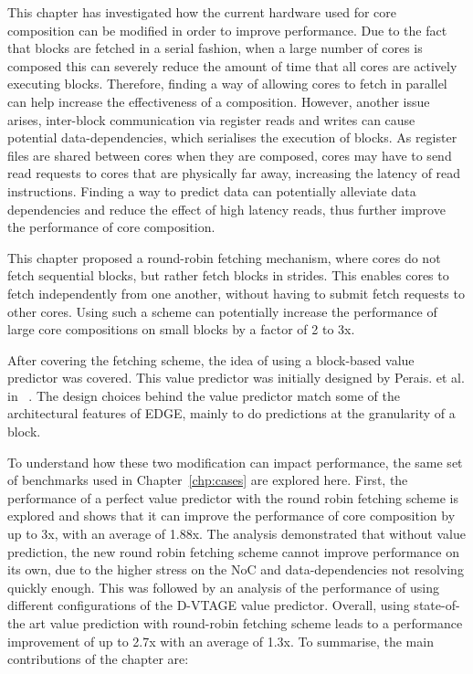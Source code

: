 This chapter has investigated how the current hardware used for core composition can be modified in order to improve performance.
Due to the fact that blocks are fetched in a serial fashion, when a large number of cores is composed this can severely reduce the amount of time that all cores are actively executing blocks.
Therefore, finding a way of allowing cores to fetch in parallel can help increase the effectiveness of a composition.
However, another issue arises, inter-block communication via register reads and writes can cause potential data-dependencies, which serialises the execution of blocks.
As register files are shared between cores when they are composed, cores may have to send read requests to cores that are physically far away, increasing the latency of read instructions.
Finding a way to predict data can potentially alleviate data dependencies and reduce the effect of high latency reads, thus further improve the performance of core composition.

This chapter proposed a round-robin fetching mechanism, where cores do not fetch sequential blocks, but rather fetch blocks in strides.
This enables cores to fetch independently from one another, without having to submit fetch requests to other cores.
Using such a scheme can potentially increase the performance of large core compositions on small blocks by a factor of 2 to 3x.

After covering the fetching scheme, the idea of using a block-based value predictor was covered.
This value predictor was initially designed by Perais. et al. in ~\cite{peraisVTAGE2014, peraisBeBop2015}.
The design choices behind the value predictor match some of the architectural features of EDGE, mainly to do predictions at the granularity of a block.

To understand how these two modification can impact performance, the same set of benchmarks used in Chapter~\ref{chp:cases} are explored here.
First, the performance of a perfect value predictor with the round robin fetching scheme is explored and shows that it can improve the performance of core composition by up to 3x, with an average of 1.88x.
The analysis demonstrated that without value prediction, the new round robin fetching scheme cannot improve performance on its own, due to the higher stress on the NoC and data-dependencies not resolving quickly enough.
This was followed by an analysis of the performance of using different configurations of the D-VTAGE value predictor.
Overall, using state-of-the art value prediction with round-robin fetching scheme leads to a performance improvement of up to 2.7x with an average of 1.3x.
To summarise, the main contributions of the chapter are:

